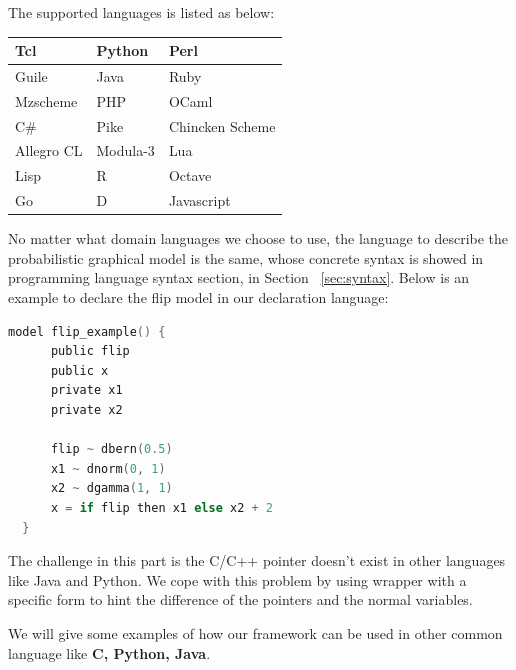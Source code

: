 The supported languages is listed as below:

\begin{center}
\begin{tabular}{|l|l|l|}
\hline
Tcl & Python & Perl \\
\hline
Guile & Java & Ruby \\
\hline
Mzscheme & PHP & OCaml \\
\hline
C\# & Pike & Chincken Scheme \\
\hline
Allegro CL & Modula-3 & Lua \\
\hline
Lisp & R & Octave \\
\hline
Go & D & Javascript \\
\hline
\end{tabular}
\end{center}

No matter what domain languages we choose to use, the language to describe the probabilistic graphical model is the same, whose concrete syntax is showed in programming language syntax section, in Section ~\ref{sec:syntax}. Below is an example to declare the flip model in our declaration language:

\begin{lstlisting}[language=C]
  model flip_example() {
      public flip
      public x
      private x1
      private x2

      flip ~ dbern(0.5)
      x1 ~ dnorm(0, 1)
      x2 ~ dgamma(1, 1)
      x = if flip then x1 else x2 + 2
  }
\end{lstlisting}

The challenge in this part is the C/C++ pointer doesn’t exist in other languages like Java and Python. We cope with this problem by using wrapper with a specific form to hint the difference of the pointers and the normal variables.
  
We will give some examples of how our framework can be used in other common language like \textbf{C, Python, Java}.
  
